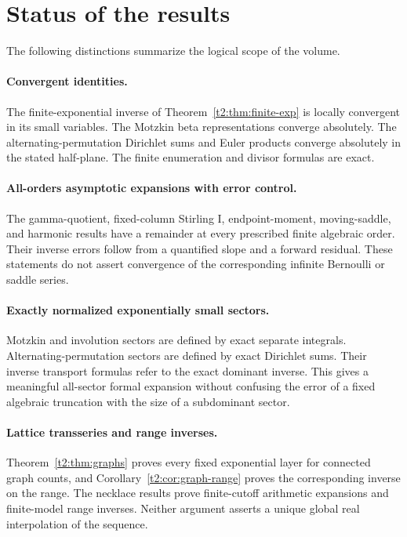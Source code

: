 \documentclass[11pt,openany]{book}
\numberwithin{equation}{chapter}
\theoremstyle{plain}
\theoremstyle{definition}
\theoremstyle{remark}
\begin{document}
\section{Status of the results}

The following distinctions summarize the logical scope of the volume.

\paragraph{Convergent identities.}
The finite-exponential inverse of Theorem~\ref{t2:thm:finite-exp} is locally convergent in its small variables. The Motzkin beta representations converge absolutely. The alternating-permutation Dirichlet sums and Euler products converge absolutely in the stated half-plane. The finite enumeration and divisor formulas are exact.

\paragraph{All-orders asymptotic expansions with error control.}
The gamma-quotient, fixed-column Stirling I, endpoint-moment, moving-saddle, and harmonic results have a remainder at every prescribed finite algebraic order. Their inverse errors follow from a quantified slope and a forward residual. These statements do not assert convergence of the corresponding infinite Bernoulli or saddle series.

\paragraph{Exactly normalized exponentially small sectors.}
Motzkin and involution sectors are defined by exact separate integrals. Alternating-permutation sectors are defined by exact Dirichlet sums. Their inverse transport formulas refer to the exact dominant inverse. This gives a meaningful all-sector formal expansion without confusing the error of a fixed algebraic truncation with the size of a subdominant sector.

\paragraph{Lattice transseries and range inverses.}
Theorem~\ref{t2:thm:graphs} proves every fixed exponential layer for connected graph counts, and Corollary~\ref{t2:cor:graph-range} proves the corresponding inverse on the range. The necklace results prove finite-cutoff arithmetic expansions and finite-model range inverses. Neither argument asserts a unique global real interpolation of the sequence.
\end{document}
